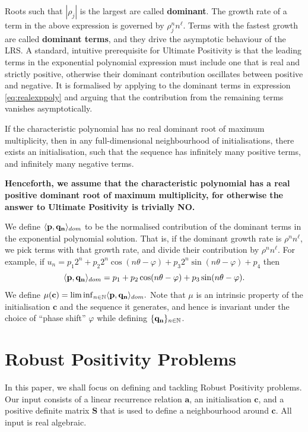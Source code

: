 Roots such that $|\rho_j|$ is the largest are called \textbf{dominant}. The growth rate of a term in the above expression is governed by $\rho_j^n n^\ell$. Terms with the fastest growth are called \textbf{dominant terms}, and they drive the asymptotic behaviour of the LRS. A standard, intuitive prerequisite for Ultimate Positivity is that the leading terms in the exponential polynomial expression must include one that is real and strictly positive, otherwise their dominant contribution oscillates between positive and negative. It is formalised by applying \cite[Lemma 4]{Braverman06} to the dominant terms in expression \ref{eq:realexppoly} and arguing that the contribution from the remaining terms vanishes asymptotically. 
\begin{proposition}
\label{prop:folklore}
If the characteristic polynomial has no real dominant root of maximum multiplicity, then in any full-dimensional neighbourhood of initialisations, there exists an initialisation, such that the sequence has infinitely many positive terms, and infinitely many negative terms.
\end{proposition}

\textbf{Henceforth, we assume that the characteristic polynomial has a real positive dominant root of maximum multiplicity, for otherwise the answer to Ultimate Positivity is trivially NO.} 

We define $\langle\mathbf{p}, \mathbf{q_n}\rangle_{dom}$ to be the normalised contribution of the dominant terms in the exponential polynomial solution. That is, if the dominant growth rate is $\rho^n n^\ell$, we pick terms with that growth rate, and divide their contribution by $\rho^n n^\ell$. For example, if
$
u_n = p_1 2^n + p_2 2^n\cos (n\theta -\varphi) + p_3 2^n \sin (n\theta-\varphi) + p_4
$
then $$\langle\mathbf{p}, \mathbf{q_n}\rangle_{dom} = p_1  + p_2 \cos (n\theta-\varphi) + p_3 \sin (n\theta-\varphi).$$
We define
$
\mu(\mathbf{c}) = \liminf_{n \in \mathbb{N}} \langle\mathbf{p}, \mathbf{q_n}\rangle_{dom}.
$
Note that $\mu$ is an intrinsic property of the initialisation $\mathbf{c}$ and the sequence it generates, and hence is invariant under the choice of ``phase shift'' $\varphi$ while defining $\{\mathbf{q_n}\}_{n\in \mathbb{N}}$.

\section{Robust Positivity Problems}
\label{section:problems}

In this paper, we shall focus on defining and tackling Robust Positivity problems. Our input consists of a linear recurrence relation $\mathbf{a}$, an initialisation $\mathbf{c}$, and a positive definite matrix $\mathbf{S}$ that is used to define a neighbourhood around $\mathbf{c}$. All input is real algebraic.

